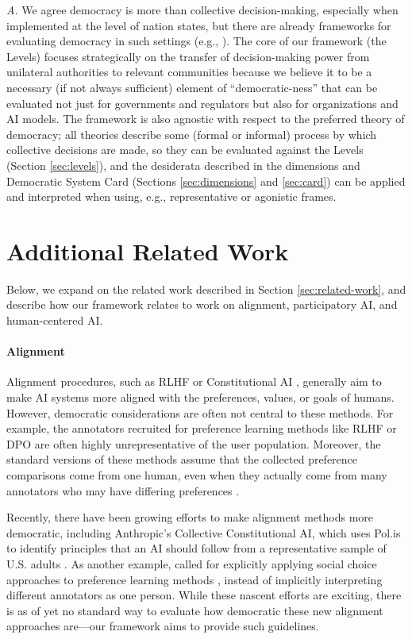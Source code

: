 \documentclass{article}
\begin{document}
    \textit{A.} We agree democracy is more than collective decision-making, especially when implemented at the level of nation states, but there are already frameworks for evaluating democracy in such settings (e.g., \citet{Lijphart2012}). The core of our framework (the Levels) focuses strategically on the transfer of decision-making power from unilateral authorities to relevant communities because we believe it to be a necessary (if not always sufficient) element of ``democratic-ness'' that can be evaluated not just for governments and regulators but also for organizations and AI models. The framework is also agnostic with respect to the preferred theory of democracy; all theories describe some (formal or informal) process by which collective decisions are made, so they can be evaluated against the Levels (Section \ref{sec:levels}), and the desiderata described in the dimensions and Democratic System Card (Sections \ref{sec:dimensions} and \ref{sec:card}) can be applied and interpreted when using, e.g., representative or agonistic frames.

\section{Additional Related Work}
\label{appendix:related-work}

    Below, we expand on the related work described in Section \ref{sec:related-work}, and describe how our framework relates to work on alignment, participatory AI, and human-centered AI.

\paragraph{Alignment}

    Alignment procedures, such as RLHF \citep{ouyang2022training} or Constitutional AI \citep{bai2022constitutional}, generally aim to make AI systems more aligned with the preferences, values, or goals of humans. However, democratic considerations are often not central to these methods. For example, the annotators recruited for preference learning methods like RLHF or DPO \citep{rafailov2024direct} are often highly unrepresentative of the user population. Moreover, the standard versions of these methods assume that the collected preference comparisons come from one human, even when they actually come from many annotators who may have differing preferences \citep{siththaranjan2024dpl}. 
    
    Recently, there have been growing efforts to make alignment methods more democratic, including Anthropic's Collective Constitutional AI, which uses Pol.is to identify principles that an AI should follow from a representative sample of U.S. adults \citep{huang2024}. As another example, \citet{conitzer2024social} called for explicitly applying social choice approaches to preference learning methods \citep{ge2024axioms}, instead of implicitly interpreting different annotators as one person. While these nascent efforts are exciting, there is as of yet no standard way to evaluate how democratic these new alignment approaches are---our framework aims to provide such guidelines.
    
\end{document}
